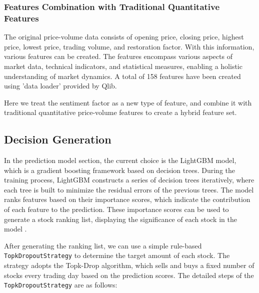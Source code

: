 \documentclass[conference]{IEEEtran}
\begin{document}
\subsubsection{\textbf{Features Combination with Traditional Quantitative Features}}
The original price-volume data consists of opening price, closing price, highest price, lowest price, trading volume, and restoration factor. 
With this information, various features can be created.
The features encompass various aspects of market data, technical indicators, and statistical measures, enabling a holistic understanding of market dynamics. 
A total of 158 features have been created using 'data loader' provided by Qlib.

Here we treat the sentiment factor as a new type of feature, and combine it with traditional quantitative price-volume features to create a hybrid feature set.

\subsection{\textbf{Decision Generation}}

In the prediction model section, the current choice is the LightGBM model, which is a gradient boosting framework based on decision trees. 
During the training process, LightGBM constructs a series of decision trees iteratively, where each tree is built to minimize the residual errors of the previous trees. 
The model ranks features based on their importance scores, which indicate the contribution of each feature to the prediction. 
These importance scores can be used to generate a stock ranking list, displaying the significance of each stock in the model \cite{ke2017}.

After generating the ranking list, we can use a simple rule-based \texttt{TopkDropoutStrategy} to determine the target amount of each stock. 
The strategy adopts the Topk-Drop algorithm, which sells and buys a fixed number of stocks every trading day based on the prediction scores. 
The detailed steps of the \texttt{TopkDropoutStrategy} are as follows:
\end{document}

